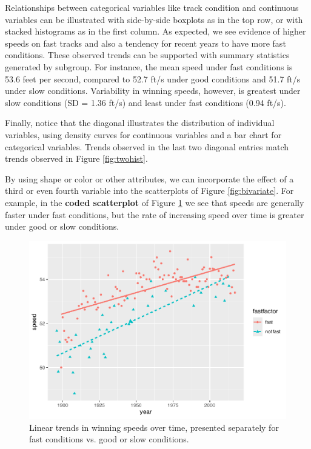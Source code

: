 \documentclass[
]{krantz}
\begin{document}
Relationships between categorical variables like track condition and continuous variables can be illustrated with side-by-side boxplots as in the top row, or with stacked histograms as in the first column. As expected, we see evidence of higher speeds on fast tracks and also a tendency for recent years to have more fast conditions. These observed trends can be supported with summary statistics generated by subgroup. For instance, the mean speed under fast conditions is 53.6 feet per second, compared to 52.7 ft/s under good conditions and 51.7 ft/s under slow conditions. Variability in winning speeds, however, is greatest under slow conditions (SD = 1.36 ft/s) and least under fast conditions (0.94 ft/s).

Finally, notice that the diagonal illustrates the distribution of individual variables, using density curves for continuous variables and a bar chart for categorical variables. Trends observed in the last two diagonal entries match trends observed in Figure \ref{fig:twohist}.

By using shape or color or other attributes, we can incorporate the effect of a third or even fourth variable into the scatterplots of Figure \ref{fig:bivariate}. For example, in the \textbf{coded scatterplot}  of Figure \ref{fig:codeds} we see that speeds are generally faster under fast conditions, but the rate of increasing speed over time is greater under good or slow conditions.

\begin{figure}

{\centering \includegraphics[width=0.9\linewidth]{bookdown-BeyondMLR_files/figure-latex/codeds-1} 

}

\caption{Linear trends in winning speeds over time, presented separately for fast conditions vs. good or slow conditions.}\label{fig:codeds}
\end{figure}
\end{document}
